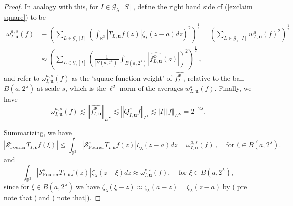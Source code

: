 \documentclass{amsart}%
\theoremstyle{plain}
\numberwithin{equation}{section}
\begin{document}
\begin{proof}
In analogy with this, for $I\in\mathcal{G}_{\lambda}\left[  S\right]  $,
define the right hand side of (\ref{exclaim square}) to be
\begin{align*}
\omega_{I,\mathbf{u}}^{a,s}\left(  f\right)   &  \equiv\left(  \sum
_{L\in\mathcal{G}_{s}\left[  I\right]  }\left(  \int_{\mathbb{R}^{3}%
}\left\vert T_{L,\mathbf{u}}f\left(  z\right)  \right\vert \zeta_{\lambda
}\left(  z-a\right)  dz\right)  ^{2}\right)  ^{\frac{1}{2}}=\left(  \sum
_{L\in\mathcal{G}_{s}\left[  I\right]  }w_{L,\mathbf{u}}^{a}\left(  f\right)
^{2}\right)  ^{\frac{1}{2}}\\
&  \approx\left(  \sum_{L\in\mathcal{G}_{s}\left[  I\right]  }\left(  \frac
{1}{\left\vert B\left(  a,2^{\lambda}\right)  \right\vert }\int_{B\left(
a,2^{\lambda}\right)  }\left\vert \widehat{f_{L,\mathbf{u}}^{\Phi}}\left(
z\right)  \right\vert \right)  ^{2}\right)  ^{\frac{1}{2}}\ ,
\end{align*}
and refer to $\omega_{I,\mathbf{u}}^{a,s}\left(  f\right)  $ as the `square
function weight' of $\widehat{f_{I,\mathbf{u}}^{\Phi}}$ relative to the ball
$B\left(  a,2^{\lambda}\right)  $ at scale $s$, which is the $\ell^{2}$ norm
of the averages $w_{L,\mathbf{u}}^{a}\left(  f\right)  $. Finally, we have
\[
\omega_{I,\mathbf{u}}^{a,s}\left(  f\right)  \lesssim\left\Vert \widehat
{f_{I,\mathbf{u}}^{\Phi}}\right\Vert _{L^{\infty}}\lesssim\left\Vert
Q_{I,\mathbf{u}}^{s}f\right\Vert _{L^{1}}\lesssim\left\vert I\right\vert
\left\Vert f\right\Vert _{L^{\infty}}=2^{-2\lambda}.
\]


Summarizing, we have%
\begin{equation}
\left\vert \mathcal{S}_{\operatorname*{Fourier}}^{s}T_{I,\mathbf{u}}f\left(
\xi\right)  \right\vert \leq\int_{\mathbb{R}^{3}}\left\vert \mathcal{S}%
_{\operatorname*{Fourier}}^{s}T_{I,\mathbf{u}}f\left(  z\right)  \right\vert
\zeta_{\lambda}\left(  z-a\right)  dz=\omega_{I,\mathbf{u}}^{a,s}\left(
f\right)  \ ,\ \ \ \ \ \text{for }\xi\in B\left(  a,2^{\lambda}\right)  .
\label{pre exclaim'}%
\end{equation}
and
\begin{equation}
\int_{\mathbb{R}^{3}}\left\vert \mathcal{S}_{\operatorname*{Fourier}}%
^{s}T_{I,\mathbf{u}}f\left(  z\right)  \right\vert \zeta_{\lambda}\left(
z-\xi\right)  dz\approx\omega_{I,\mathbf{u}}^{a,s}\left(  f\right)  \text{
},\ \ \ \ \ \text{for }\xi\in B\left(  a,2^{\lambda}\right)  ,
\label{exclaim'}%
\end{equation}
since for $\xi\in B\left(  a,2^{\lambda}\right)  $ we have $\zeta_{\lambda
}\left(  \xi-z\right)  \approx\zeta_{\lambda}\left(  a-z\right)
=\zeta_{\lambda}\left(  z-a\right)  $ by (\ref{pre note that}) and
(\ref{note that}).


\end{proof}
\end{document}
